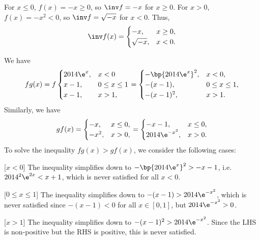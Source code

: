 \begin{solution}
    \begin{ppart}
        For $x \leq 0$, $f(x) = -x \geq 0$, so $\inv f = -x$ for $x \geq 0$. For $x > 0$, $f(x) = -x^2 < 0$, so $\inv f = \sqrt{-x}$ for $x < 0$. Thus, \[\inv f(x)= \begin{cases}-x , & x \geq 0, \\ \sqrt{-x} , & x < 0.\end{cases}\]
    \end{ppart}
    \begin{ppart}
        We have \[fg(x) = f\begin{cases}2014 \e^x, & x< 0 \\ x-1 , & 0 \leq  x \leq 1 \\ x-1, & x > 1,\end{cases} = \begin{cases}-\bp{2014\e^x}^2 , & x < 0, \\ -(x-1), & 0 \leq x \leq 1, \\ -(x-1)^2, & x > 1.\end{cases}\] Similarly, we have \[gf(x) = \begin{cases}-x, & x \leq 0, \\ -x^2, & x > 0,\end{cases} = \begin{cases}-x - 1, & x \leq 0, \\ 2014 \e^{-x^2}, & x > 0.\end{cases}\] To solve the inequality $fg(x) > gf(x)$, we consider the following cases:

        [$x < 0$] The inequality simplifies down to $-\bp{2014\e^x}^2 > -x -1$, i.e. $2014^2 \e^{2x} < x + 1$, which is never satisfied for all $x < 0$.

        [$0 \leq x \leq 1$] The inequality simplifies down to $-(x-1) > 2014\e^{-x^2}$, which is never satisfied since $-(x-1) < 0$ for all $x \in [0, 1]$, but $2014 \e^{-x^2} > 0$.

        [$x > 1$] The inequality simplifies down to $-(x-1)^2 > 2014\e^{-x^2}$. Since the LHS is non-positive but the RHS is positive, this is never satisfied.


\end{ppart}
\end{solution}
